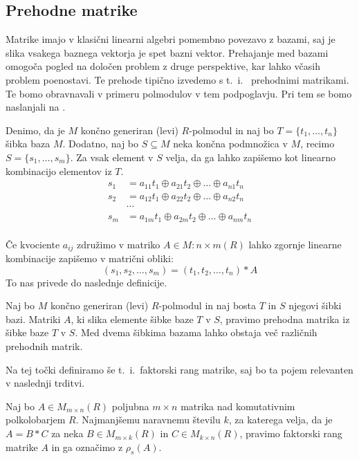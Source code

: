 \documentclass[mat1]{fmfdelo}
\begin{document}
\subsection{Prehodne matrike}\label{subsect:prehodmat}
Matrike imajo v klasični linearni algebri pomembno povezavo z bazami, saj je slika vsakega baznega vektorja je spet bazni vektor. Prehajanje med bazami omogoča pogled na določen problem z druge perspektive, kar lahko včasih problem poenostavi. Te prehode tipično izvedemo s t.~i.~ prehodnimi matrikami. Te bomo obravnavali v primeru polmodulov v tem podpoglavju. Pri tem se bomo naslanjali na \cite[poglavje 3]{bib:Tanbase}.

Denimo, da je $M$ končno generiran (levi) $R$-polmodul in naj bo $T = \{t_1, \ldots, t_n\}$ šibka baza $M$. Dodatno, naj bo $S\subseteq M$ neka končna podmnožica v $M$, recimo $S = \{s_1, \ldots, s_m\}$. Za vsak element v $S$ velja, da ga lahko zapišemo kot linearno kombinacijo elementov iz $T$. \begin{align*}
	s_1 &= a_{11}t_1 \oplus a_{21}t_2 \oplus \ldots \oplus a_{n1}t_n \\
	s_2 &= a_{12}t_1 \oplus a_{22}t_2 \oplus \ldots \oplus a_{n2}t_n \\
	&\cdots \\
	s_m &= a_{1m}t_1 \oplus a_{2m}t_2 \oplus \ldots \oplus a_{nm}t_n \\
\end{align*}

Če kvociente $a_{ij}$ združimo v matriko $A\in M:{n\times m}(R)$ lahko zgornje linearne kombinacije zapišemo v matrični obliki:$$
(s_1, s_2, \ldots, s_m )
 = (t_1, t_2, \ldots, t_n) * A$$ 
To nas privede do naslednje definicije.

\begin{definicija}\label{def:prehodmat}
	Naj bo $M$ končno generiran (levi) $R$-polmodul in naj bosta $T$ in $S$ njegovi šibki bazi. Matriki $A$, ki slika elemente šibke baze $T$ v $S$, pravimo prehodna matrika iz šibke baze $T$ v $S$. Med dvema šibkima bazama lahko obstaja več različnih prehodnih matrik.
\end{definicija}

Na tej točki definiramo še t.~i.~faktorski rang matrike, saj bo ta pojem relevanten v naslednji trditvi.

\begin{definicija}\label{def:faktorrang}
	Naj bo $A\in M_{m\times n}(R)$ poljubna $m\times n$ matrika nad komutativnim polkolobarjem $R$. Najmanjšemu naravnemu številu $k$, za katerega velja, da je $A= B*C$ za neka $B\in M_{m\times k}(R)$ in $C\in M_{k\times n}(R)$, pravimo faktorski rang matrike $A$ in ga označimo z $\rho_s(A)$.
\end{definicija}
\end{document}
